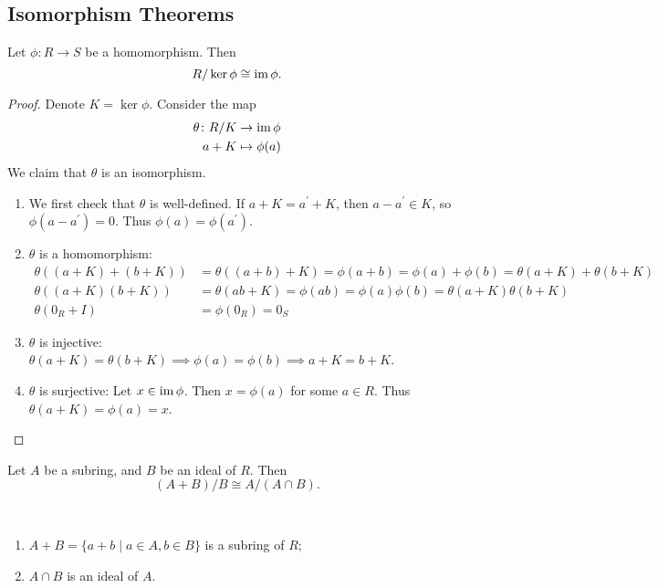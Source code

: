 \subsection{Isomorphism Theorems}
\begin{theorem}
Let $\phi\colon R\to S$ be a homomorphism. Then
\begin{equation}
R/\ker\phi\cong\operatorname{im}\phi.
\end{equation}
\end{theorem}

\begin{proof}
Denote $K=\ker\phi$. Consider the map
\begin{align*}
\theta\colon R/K&\to\operatorname{im}\phi\\
a+K&\mapsto\phi(a)
\end{align*}
We claim that $\theta$ is an isomorphism.
\begin{enumerate}
\item We first check that $\theta$ is well-defined. If $a+K=a^\prime+K$, then $a-a^\prime\in K$, so $\phi(a-a^\prime)=0$. Thus $\phi(a)=\phi(a^\prime)$.
\item $\theta$ is a homomorphism: 
\begin{align*}
\theta((a+K)+(b+K))&=\theta((a+b)+K)=\phi(a+b)=\phi(a)+\phi(b)=\theta(a+K)+\theta(b+K)\\
\theta((a+K)(b+K))&=\theta(ab+K)=\phi(ab)=\phi(a)\phi(b)=\theta(a+K)\theta(b+K)\\
\theta(0_R+I)&=\phi(0_R)=0_S
\end{align*}
\item $\theta$ is injective: $\theta(a+K)=\theta(b+K)\implies\phi(a)=\phi(b)\implies a+K=b+K$.
\item $\theta$ is surjective: Let $x\in\operatorname{im}\phi$. Then $x=\phi(a)$ for some $a\in R$. Thus $\theta(a+K)=\phi(a)=x$.
\end{enumerate}
\end{proof}

\begin{theorem}
Let $A$ be a subring, and $B$ be an ideal of $R$. Then
\begin{equation}
(A+B)/B\cong A/(A\cap B).
\end{equation}
\end{theorem}

\begin{lemma*} \
\begin{enumerate}[label=(\roman*)]
\item $A+B=\{a+b\mid a\in A,b\in B\}$ is a subring of $R$;
\item $A\cap B$ is an ideal of $A$.
\end{enumerate}
\end{lemma*}

